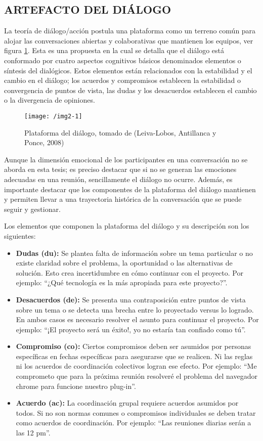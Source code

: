 \subsection{ARTEFACTO DEL DIÁLOGO}

La teoría de diálogo/acción  postula una plataforma como un terreno común para alojar las conversaciones abiertas y colaborativas que mantienen los equipos, ver figura \ref{img2-1}. Esta es una propuesta en la cual se detalla que el diálogo está conformado por cuatro aspectos cognitivos básicos denominados elementos o síntesis del dialógicos. Estos elementos están relacionados con la estabilidad y el cambio en el diálogo; los acuerdos y compromisos establecen la estabilidad o convergencia de puntos de vista, las dudas y los desacuerdos establecen el cambio o la divergencia de opiniones.

\begin{figure}[h]
\centering
\texttt{[image: /img2-1]}
\caption{Plataforma del diálogo, tomado de (Leiva-Lobos, Antillanca y Ponce, 2008)} 
\label{img2-1}
\end{figure}

Aunque la dimensión emocional de los participantes en una conversación no se aborda en esta tesis; es preciso destacar que si no se generan las emociones adecuadas en una reunión, sencillamente el diálogo no ocurre. Además, es importante destacar que los componentes de la plataforma del diálogo mantienen y permiten llevar a una trayectoria histórica de la conversación que se puede seguir y gestionar.

Los elementos que componen la plataforma del diálogo y su descripción son los siguientes:

\begin{itemize}
	\item \textbf{Dudas (du):} Se plantea falta de información sobre un tema particular o no existe claridad sobre el problema, la oportunidad o las alternativas de solución. Esto crea incertidumbre en cómo continuar con el proyecto. Por ejemplo: “¿Qué tecnología es la más apropiada para este proyecto?”.
	\item \textbf{Desacuerdos (de):} Se presenta una contraposición entre puntos de vista sobre un tema o se detecta una brecha entre lo proyectado versus lo logrado. En ambos casos es necesario resolver el asunto para continuar el proyecto. Por ejemplo: “¡El proyecto será un éxito!,  yo no estaría tan confiado como tú”.
	\item \textbf{Compromiso (co):} Ciertos compromisos deben ser asumidos por personas específicas en fechas específicas para asegurarse que se realicen. Ni las reglas ni los acuerdos de coordinación colectivos logran ese efecto.  Por ejemplo: “Me comprometo que para la próxima reunión resolveré el problema del navegador chrome para funcione nuestro plug-in”.
	\item \textbf{Acuerdo (ac):} La coordinación grupal requiere acuerdos asumidos por todos. Si no son normas comunes o compromisos individuales se deben tratar como acuerdos de coordinación.  Por ejemplo: “Las reuniones diarias serán a las 12 pm”.

\end{itemize}

